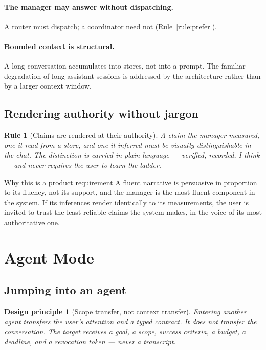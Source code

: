 \documentclass[11pt]{article}
\newtheorem{principle}{Design principle}
\newtheorem{drule}{Rule}
\begin{document}
\paragraph{The manager may answer without dispatching.} A router must dispatch; a coordinator need not (Rule~\ref{rule:prefer}).

\paragraph{Bounded context is structural.} A long conversation accumulates into stores, not into a prompt. The familiar degradation of long assistant sessions is addressed by the architecture rather than by a larger context window.

\subsection{Rendering authority without jargon}

\begin{drule}[Claims are rendered at their authority]
\label{rule:render}
A claim the manager measured, one it read from a store, and one it inferred must be visually distinguishable in the chat. The distinction is carried in plain language --- \emph{verified}, \emph{recorded}, \emph{I think} --- and never requires the user to learn the ladder.
\end{drule}

\begin{claimbox}{Why this is a product requirement}
A fluent narrative is persuasive in proportion to its fluency, not its support, and the manager is the most fluent component in the system. If its inferences render identically to its measurements, the user is invited to trust the least reliable claims the system makes, in the voice of its most authoritative one.
\end{claimbox}

\section{Agent Mode}
\label{sec:agentmode}

\subsection{Jumping into an agent}

\begin{principle}[Scope transfer, not context transfer]
\label{prin:scope}
Entering another agent transfers the user's \emph{attention} and a typed \emph{contract}. It does not transfer the conversation. The target receives a goal, a scope, success criteria, a budget, a deadline, and a revocation token --- never a transcript.
\end{principle}
\end{document}
